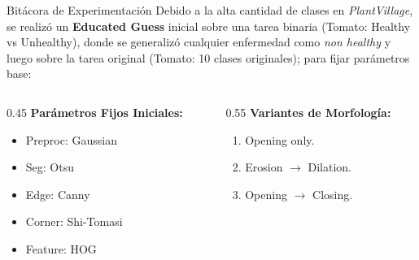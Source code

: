 \documentclass[10pt]{beamer}
\begin{document}
\begin{frame}{Bitácora de Experimentación}
    Debido a la alta cantidad de clases en \textit{PlantVillage}, se realizó un \textbf{Educated Guess} inicial sobre una tarea binaria (Tomato: Healthy vs Unhealthy), donde se generalizó cualquier enfermedad como \textit{non healthy} y luego sobre la tarea original (Tomato: 10 clases originales); para fijar parámetros base:
    \newline
    \begin{columns}
        \begin{column}{0.45\textwidth}
            \textbf{Parámetros Fijos Iniciales:}
            \begin{itemize}
                \item \small Preproc: Gaussian
                \item \small Seg: Otsu
                \item \small Edge: Canny
                \item \small Corner: Shi-Tomasi
                \item \small Feature: HOG
            \end{itemize}
        \end{column}
        \begin{column}{0.55\textwidth}
            \textbf{Variantes de Morfología:}
            \begin{enumerate}
                \item \small Opening only.
                \item \small Erosion $\rightarrow$ Dilation.
                \item \small Opening $\rightarrow$ Closing.
            \end{enumerate}
        \end{column}
    \end{columns}
\end{frame}
\end{document}
